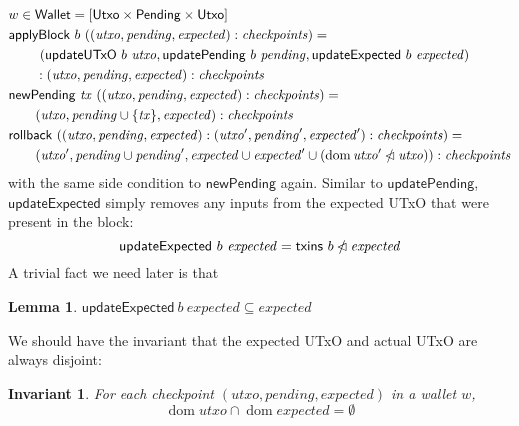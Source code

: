 \documentclass{article}
\newcommand{\restrictdom}{\lhd}
\newcommand{\subtractdom}{\mathbin{\slashed{\restrictdom}}}
\DeclareMathOperator{\dom}{dom}
\newtheorem{lemma}{Lemma}
\newtheorem{invariant}{Invariant}
\begin{document}
\begin{align*}
& w \in \mathsf{Wallet} = [\mathsf{Utxo} \times \mathsf{Pending} \times \mathsf{Utxo}] \\
& \mathsf{applyBlock} ~ b ~ ((\mathit{utxo}, \mathit{pending}, \mathit{expected}) : \mathit{checkpoints}) = \\
& \qquad ~ (\mathsf{updateUTxO} ~ b ~ \mathit{utxo}, \mathsf{updatePending} ~ b ~ \mathit{pending}, \mathsf{updateExpected} ~ b ~ \mathit{expected}) \\
& \qquad : (\mathit{utxo}, \mathit{pending}, \mathit{expected}) : \mathit{checkpoints} \\
& \mathsf{newPending} ~ \mathit{tx} ~ ((\mathit{utxo}, \mathit{pending}, \mathit{expected}) : \mathit{checkpoints}) = \\
& \qquad (\mathit{utxo}, \mathit{pending} \cup \{\mathit{tx}\}, \mathit{expected}) : \mathit{checkpoints} \\
& \mathsf{rollback} ~ ((\mathit{utxo}, \mathit{pending}, \mathit{expected}) : (\mathit{utxo}', \mathit{pending}', \mathit{expected}') : \mathit{checkpoints}) = \\
& \qquad (\mathit{utxo}', \mathit{pending} \cup \mathit{pending}', \mathit{expected} \cup \mathit{expected}' \cup (\dom \mathit{utxo}' \subtractdom \mathit{utxo})) : \mathit{checkpoints} \\
\end{align*}
%
with the same side condition to $\mathsf{newPending}$ again. Similar to
$\mathsf{updatePending}$, $\mathsf{updateExpected}$ simply removes any inputs
from the expected UTxO that were present in the block:
%
\begin{equation*}
\mathsf{updateExpected} ~ b ~ \mathit{expected} = \mathsf{txins} ~ b \subtractdom \mathit{expected}
\end{equation*}
%
A trivial fact we need later is that
%
\begin{lemma} \label{lemma:updateExpected_is_filter}
\begin{math}
\mathsf{updateExpected} ~ b ~ \mathit{expected} \subseteq \mathit{expected}
\end{math}
\end{lemma}

We should have the invariant that the expected UTxO and actual UTxO are always disjoint:

\begin{invariant}
For each checkpoint $(\mathit{utxo}, \mathit{pending}, \mathit{expected})$ in a wallet $w$,
\begin{equation*}
\dom \mathit{utxo} \cap \dom \mathit{expected} = \emptyset
\end{equation*}
\end{invariant}
\end{document}
